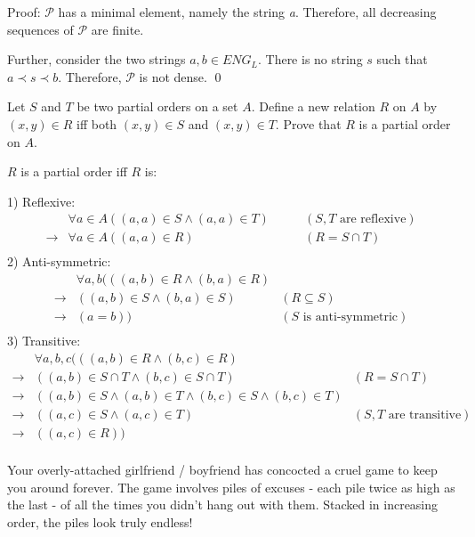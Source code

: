 \documentclass[addpoints]{exam}
\begin{document}
\begin{questions}
\begin{solution}
    Proof: $\mathcal{P}$ has a minimal element, namely the string \textit{a}. Therefore, all decreasing sequences of $\mathcal{P}$ are finite. 
    
    Further, consider the two strings $a,b \in ENG_L$. There is no string $s$ such that $a \prec s \prec b$. Therefore, $\mathcal{P}$ is not dense. \qed
     
  \end{solution}

\question
     Let $S$ and $T$ be two partial orders on a set $A$. Define a new relation $R$ on $A$ by $(x,y)\in R$ iff both $(x,y) \in S$ and $(x,y) \in T$. Prove that $R$ is a partial order on $A$.

    
      \begin{solution}
    $R$ is a partial order iff $R$ is:
    
    1) Reflexive: 
    \begin{align*}
    &\forall a \in A((a,a) \in S \wedge (a,a) \in T) \quad \quad &(S,T \text{ are reflexive})\\
    \rightarrow &\forall a \in A ((a,a) \in R) \quad \quad &(R = S \cap T)\\   
    \end{align*}
    2) Anti-symmetric:
	\begin{align*}
	&\forall a,b(((a,b) \in R \wedge (b,a) \in R)\\
	\rightarrow &((a,b) \in S \wedge (b,a) \in S) &(R \subseteq S)\\
	\rightarrow &(a = b)) &(S \text{ is anti-symmetric})\\
	\end{align*}
	3) Transitive:
	\begin{align*}
	&\forall a,b,c(((a,b) \in R \wedge (b,c) \in R)\\
	\rightarrow &((a,b) \in S \cap T \wedge (b,c) \in S \cap T) &(R = S \cap T)\\
	\rightarrow &((a,b) \in S \wedge (a,b) \in T \wedge (b,c) \in S \wedge (b,c) \in T)\\
	\rightarrow &((a,c) \in S \wedge (a,c) \in T) &(S,T \text{ are transitive})\\
	\rightarrow &((a,c) \in R)) \\
	\end{align*}
	
  \end{solution}

\question Your overly-attached girlfriend / boyfriend has concocted a cruel game to keep you around forever. The game involves piles of excuses - each pile twice as high as the last - of all the times you didn't hang out with them. Stacked in increasing order, the piles look truly endless! 


\end{questions}
\end{document}
